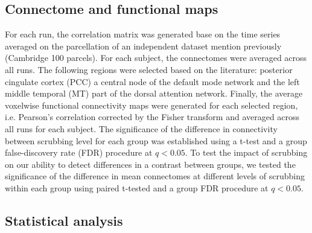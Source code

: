 \documentclass[authoryear,preprint,review]{elsarticle}
\begin{document}
\subsection{Connectome and functional maps}
For each run, the correlation matrix was generated base on the time series averaged on the parcellation of an independent dataset mention previously (Cambridge 100 parcels). For each subject, the connectomes were averaged across all runs. The following regions were selected based on the literature: posterior cingulate cortex (PCC) a central node of the default mode network and the left middle temporal (MT) part of the dorsal attention network. Finally, the average voxelwise functional connectivity maps were generated for each selected region, i.e. Pearson's correlation corrected by the Fisher transform and averaged across all runs for each subject. The significance of the difference in connectivity between scrubbing level for each group was established using a t-test and a group false-discovery rate (FDR) procedure \cite{Hu2010} at $q<0.05$. To test the impact of scrubbing on our ability to detect differences in a contrast between groups, we tested the significance of the difference in mean connectomes at different levels of scrubbing within each group using paired t-tested and a group FDR procedure at $q<0.05$.

\subsection{Statistical analysis} %
\end{document}
